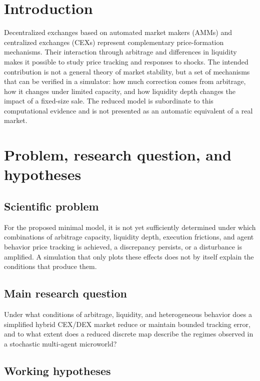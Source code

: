 \section{Introduction}

Decentralized exchanges based on automated market makers (AMMs) and centralized
exchanges (CEXs) represent complementary price-formation mechanisms. Their
interaction through arbitrage and differences in liquidity makes it possible to study
price tracking and responses to shocks. The intended contribution is not a general
theory of market stability, but a set of mechanisms that can be verified in a
simulator: how much correction comes from arbitrage, how it changes under limited
capacity, and how liquidity depth changes the impact of a fixed-size sale. The reduced
model is subordinate to this computational evidence and is not presented as an
automatic equivalent of a real market.

\section{Problem, research question, and hypotheses}

\subsection{Scientific problem}

For the proposed minimal model, it is not yet sufficiently determined under which
combinations of arbitrage capacity, liquidity depth, execution frictions, and agent
behavior price tracking is achieved, a discrepancy persists, or a disturbance is
amplified. A simulation that only plots these effects does not by itself explain the
conditions that produce them.

\subsection{Main research question}

Under what conditions of arbitrage, liquidity, and heterogeneous behavior does a
simplified hybrid CEX/DEX market reduce or maintain bounded tracking error, and to
what extent does a reduced discrete map describe the regimes observed in a stochastic
multi-agent microworld?

\subsection{Working hypotheses}

